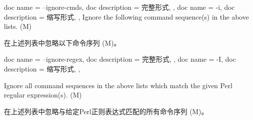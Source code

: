 \begin{docKeys}[
    doc no index,   %
    doc parameter = {~\meta{cs,cs,..}},
    ]
    {
    {
        doc name        = --ignore-cmds,
        doc description = 完整形式,
    },
    {
        doc name        = -i,
        doc description = 缩写形式,
    },
    }
Ignore the following command sequence(s) in the above lists. (M)

在上述列表中忽略以下命令序列 (M)。
    
\end{docKeys}
    
    

\begin{docKeys}[
    doc no index,   %
    doc parameter = {~},
    ]
    {
    {
        doc name        = --ignore-regex,
        doc description = 完整形式,
    },
    {
        doc name        = -I,
        doc description = 缩写形式,
    },
}

Ignore all command sequences in the above lists which match the given Perl regular expression(s). (M)

在上述列表中忽略与给定Perl正则表达式匹配的所有命令序列 (M)。
    
\end{docKeys}
    
    